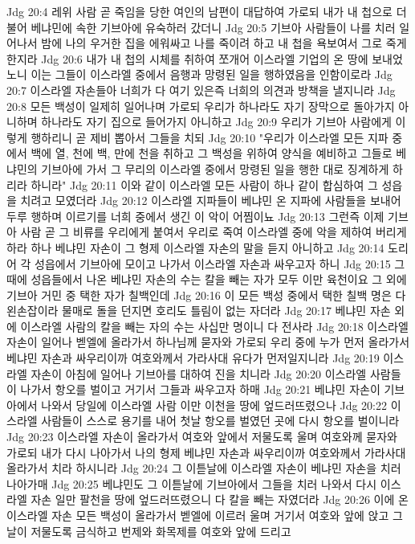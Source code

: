 Jdg 20:4  레위 사람 곧 죽임을 당한 여인의 남편이 대답하여 가로되 내가 내 첩으로 더불어 베냐민에 속한 기브아에 유숙하러 갔더니
Jdg 20:5  기브아 사람들이 나를 치러 일어나서 밤에 나의 우거한 집을 에워싸고 나를 죽이려 하고 내 첩을 욕보여서 그로 죽게 한지라
Jdg 20:6  내가 내 첩의 시체를 취하여 쪼개어 이스라엘 기업의 온 땅에 보내었노니 이는 그들이 이스라엘 중에서 음행과 망령된 일을 행하였음을 인함이로라
Jdg 20:7  이스라엘 자손들아 너희가 다 여기 있은즉 너희의 의견과 방책을 낼지니라
Jdg 20:8  모든 백성이 일제히 일어나며 가로되 우리가 하나라도 자기 장막으로 돌아가지 아니하며 하나라도 자기 집으로 들어가지 아니하고
Jdg 20:9  우리가 기브아 사람에게 이렇게 행하리니 곧 제비 뽑아서 그들을 치되
Jdg 20:10  "우리가 이스라엘 모든 지파 중에서 백에 열, 천에 백, 만에 천을 취하고 그 백성을 위하여 양식을 예비하고 그들로 베냐민의 기브아에 가서 그 무리의 이스라엘 중에서 망령된 일을 행한 대로 징계하게 하리라 하니라"
Jdg 20:11  이와 같이 이스라엘 모든 사람이 하나 같이 합심하여 그 성읍을 치려고 모였더라
Jdg 20:12  이스라엘 지파들이 베냐민 온 지파에 사람들을 보내어 두루 행하며 이르기를 너희 중에서 생긴 이 악이 어찜이뇨
Jdg 20:13  그런즉 이제 기브아 사람 곧 그 비류를 우리에게 붙여서 우리로 죽여 이스라엘 중에 악을 제하여 버리게 하라 하나 베냐민 자손이 그 형제 이스라엘 자손의 말을 듣지 아니하고
Jdg 20:14  도리어 각 성읍에서 기브아에 모이고 나가서 이스라엘 자손과 싸우고자 하니
Jdg 20:15  그 때에 성읍들에서 나온 베냐민 자손의 수는 칼을 빼는 자가 모두 이만 육천이요 그 외에 기브아 거민 중 택한 자가 칠백인데
Jdg 20:16  이 모든 백성 중에서 택한 칠백 명은 다 왼손잡이라 물매로 돌을 던지면 호리도 틀림이 없는 자더라
Jdg 20:17  베냐민 자손 외에 이스라엘 사람의 칼을 빼는 자의 수는 사십만 명이니 다 전사라
Jdg 20:18  이스라엘 자손이 일어나 벧엘에 올라가서 하나님께 묻자와 가로되 우리 중에 누가 먼저 올라가서 베냐민 자손과 싸우리이까 여호와께서 가라사대 유다가 먼저일지니라
Jdg 20:19  이스라엘 자손이 아침에 일어나 기브아를 대하여 진을 치니라
Jdg 20:20  이스라엘 사람들이 나가서 항오를 벌이고 거기서 그들과 싸우고자 하매
Jdg 20:21  베냐민 자손이 기브아에서 나와서 당일에 이스라엘 사람 이만 이천을 땅에 엎드러뜨렸으나
Jdg 20:22  이스라엘 사람들이 스스로 용기를 내어 첫날 항오를 벌였던 곳에 다시 항오를 벌이니라
Jdg 20:23  이스라엘 자손이 올라가서 여호와 앞에서 저물도록 울며 여호와께 묻자와 가로되 내가 다시 나아가서 나의 형제 베냐민 자손과 싸우리이까 여호와께서 가라사대 올라가서 치라 하시니라
Jdg 20:24  그 이튿날에 이스라엘 자손이 베냐민 자손을 치러 나아가매
Jdg 20:25  베냐민도 그 이튿날에 기브아에서 그들을 치러 나와서 다시 이스라엘 자손 일만 팔천을 땅에 엎드러뜨렸으니 다 칼을 빼는 자였더라
Jdg 20:26  이에 온 이스라엘 자손 모든 백성이 올라가서 벧엘에 이르러 울며 거기서 여호와 앞에 앉고 그 날이 저물도록 금식하고 번제와 화목제를 여호와 앞에 드리고
